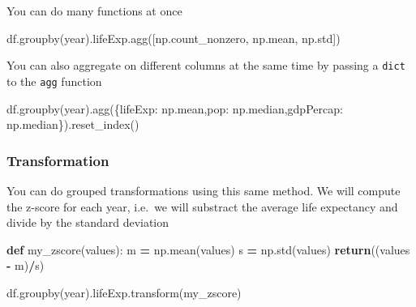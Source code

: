 \documentclass[
  letterpaper,
]{scrbook}
\newenvironment{Shaded}{\begin{snugshade}}{\end{snugshade}}
\newcommand{\ControlFlowTok}[1]{\textcolor[rgb]{0.13,0.29,0.53}{\textbf{#1}}}
\newcommand{\KeywordTok}[1]{\textcolor[rgb]{0.13,0.29,0.53}{\textbf{#1}}}
\newcommand{\NormalTok}[1]{#1}
\newcommand{\OperatorTok}[1]{\textcolor[rgb]{0.81,0.36,0.00}{\textbf{#1}}}
\newcommand{\StringTok}[1]{\textcolor[rgb]{0.31,0.60,0.02}{#1}}
\begin{document}
You can do many functions at once

\begin{Shaded}
\begin{Highlighting}[]
\NormalTok{df.groupby(}\StringTok{\textquotesingle{}year\textquotesingle{}}\NormalTok{).lifeExp.agg([np.count\_nonzero, np.mean, np.std])}
\end{Highlighting}
\end{Shaded}

You can also aggregate on different columns at the same time by passing a \texttt{dict} to the \texttt{agg} function

\begin{Shaded}
\begin{Highlighting}[]
\NormalTok{df.groupby(}\StringTok{\textquotesingle{}year\textquotesingle{}}\NormalTok{).agg(\{}\StringTok{\textquotesingle{}lifeExp\textquotesingle{}}\NormalTok{: np.mean,}\StringTok{\textquotesingle{}pop\textquotesingle{}}\NormalTok{: np.median,}\StringTok{\textquotesingle{}gdpPercap\textquotesingle{}}\NormalTok{: np.median\}).reset\_index()}
\end{Highlighting}
\end{Shaded}

\hypertarget{transformation}{%
\subsubsection{Transformation}\label{transformation}}

You can do grouped transformations using this same method. We will compute the z-score for each year, i.e.~we will substract the average life expectancy and divide by the standard deviation

\begin{Shaded}
\begin{Highlighting}[]
\KeywordTok{def}\NormalTok{ my\_zscore(values):}
\NormalTok{    m }\OperatorTok{=}\NormalTok{ np.mean(values)}
\NormalTok{    s }\OperatorTok{=}\NormalTok{ np.std(values)}
    \ControlFlowTok{return}\NormalTok{((values }\OperatorTok{{-}}\NormalTok{ m)}\OperatorTok{/}\NormalTok{s)}
\end{Highlighting}
\end{Shaded}

\begin{Shaded}
\begin{Highlighting}[]
\NormalTok{df.groupby(}\StringTok{\textquotesingle{}year\textquotesingle{}}\NormalTok{).lifeExp.transform(my\_zscore)}
\end{Highlighting}
\end{Shaded}
\end{document}
